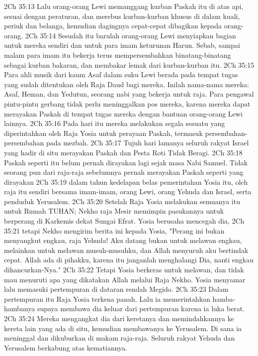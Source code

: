 2Ch 35:13  Lalu orang-orang Lewi memanggang kurban Paskah itu di atas api, sesuai dengan peraturan, dan merebus kurban-kurban khusus di dalam kuali, periuk dan belanga, kemudian dagingnya cepat-cepat dibagikan kepada orang-orang.
2Ch 35:14  Sesudah itu barulah orang-orang Lewi menyiapkan bagian untuk mereka sendiri dan untuk para imam keturunan Harun. Sebab, sampai malam para imam itu bekerja terus mempersembahkan binatang-binatang sebagai kurban bakaran, dan membakar lemak dari kurban-kurban itu.
2Ch 35:15  Para ahli musik dari kaum Asaf dalam suku Lewi berada pada tempat tugas yang sudah ditentukan oleh Raja Daud bagi mereka. Inilah nama-nama mereka: Asaf, Heman, dan Yedutun, seorang nabi yang bekerja untuk raja. Para pengawal pintu-pintu gerbang tidak perlu meninggalkan pos mereka, karena mereka dapat merayakan Paskah di tempat tugas mereka dengan bantuan orang-orang Lewi lainnya.
2Ch 35:16  Pada hari itu mereka melakukan segala sesuatu yang diperintahkan oleh Raja Yosia untuk perayaan Paskah, termasuk persembahan-persembahan pada mezbah.
2Ch 35:17  Tujuh hari lamanya seluruh rakyat Israel yang hadir di situ merayakan Paskah dan Pesta Roti Tidak Beragi.
2Ch 35:18  Paskah seperti itu belum pernah dirayakan lagi sejak masa Nabi Samuel. Tidak seorang pun dari raja-raja sebelumnya pernah merayakan Paskah seperti yang dirayakan
2Ch 35:19  dalam tahun kedelapan belas pemerintahan Yosia itu, oleh raja itu sendiri bersama imam-imam, orang Lewi, orang Yehuda dan Israel, serta penduduk Yerusalem.
2Ch 35:20  Setelah Raja Yosia melakukan semuanya itu untuk Rumah TUHAN; Nekho raja Mesir memimpin pasukannya untuk berperang di Karkemis dekat Sungai Efrat. Yosia berusaha mencegah dia,
2Ch 35:21  tetapi Nekho mengirim berita ini kepada Yosia, "Perang ini bukan menyangkut engkau, raja Yehuda! Aku datang bukan untuk melawan engkau, melainkan untuk melawan musuh-musuhku, dan Allah menyuruh aku bertindak cepat. Allah ada di pihakku, karena itu janganlah menghalangi Dia, nanti engkau dihancurkan-Nya."
2Ch 35:22  Tetapi Yosia berkeras untuk melawan, dan tidak mau menuruti apa yang dikatakan Allah melalui Raja Nekho. Yosia menyamar lalu memasuki pertempuran di dataran rendah Megido.
2Ch 35:23  Dalam pertempuran itu Raja Yosia terkena panah. Lalu ia memerintahkan hamba-hambanya supaya membawa dia keluar dari pertempuran karena ia luka berat.
2Ch 35:24  Mereka mengangkat dia dari keretanya dan memindahkannya ke kereta lain yang ada di situ, kemudian membawanya ke Yerusalem. Di sana ia meninggal dan dikuburkan di makam raja-raja. Seluruh rakyat Yehuda dan Yerusalem berkabung atas kematiannya.
